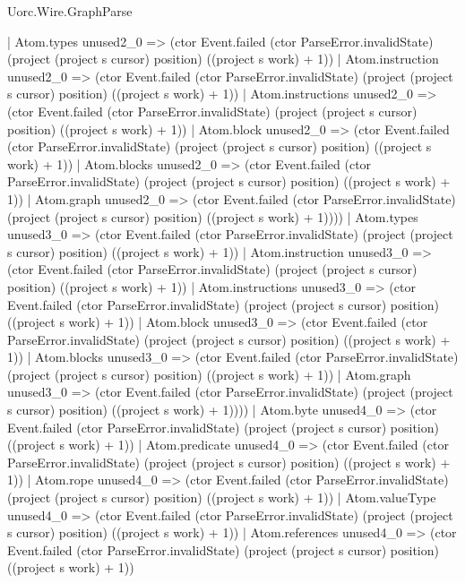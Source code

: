 \begin{lexlean}{Uorc.Wire.GraphParse}
\begin{semanticmodule}
{                      | Atom.types unused2_0 => (ctor Event.failed (ctor ParseError.invalidState) (project (project s cursor) position) ((project s work) + 1))
                      | Atom.instruction unused2_0 => (ctor Event.failed (ctor ParseError.invalidState) (project (project s cursor) position) ((project s work) + 1))
                      | Atom.instructions unused2_0 => (ctor Event.failed (ctor ParseError.invalidState) (project (project s cursor) position) ((project s work) + 1))
                      | Atom.block unused2_0 => (ctor Event.failed (ctor ParseError.invalidState) (project (project s cursor) position) ((project s work) + 1))
                      | Atom.blocks unused2_0 => (ctor Event.failed (ctor ParseError.invalidState) (project (project s cursor) position) ((project s work) + 1))
                      | Atom.graph unused2_0 => (ctor Event.failed (ctor ParseError.invalidState) (project (project s cursor) position) ((project s work) + 1))))
                  | Atom.types unused3_0 => (ctor Event.failed (ctor ParseError.invalidState) (project (project s cursor) position) ((project s work) + 1))
                  | Atom.instruction unused3_0 => (ctor Event.failed (ctor ParseError.invalidState) (project (project s cursor) position) ((project s work) + 1))
                  | Atom.instructions unused3_0 => (ctor Event.failed (ctor ParseError.invalidState) (project (project s cursor) position) ((project s work) + 1))
                  | Atom.block unused3_0 => (ctor Event.failed (ctor ParseError.invalidState) (project (project s cursor) position) ((project s work) + 1))
                  | Atom.blocks unused3_0 => (ctor Event.failed (ctor ParseError.invalidState) (project (project s cursor) position) ((project s work) + 1))
                  | Atom.graph unused3_0 => (ctor Event.failed (ctor ParseError.invalidState) (project (project s cursor) position) ((project s work) + 1))))
              | Atom.byte unused4_0 => (ctor Event.failed (ctor ParseError.invalidState) (project (project s cursor) position) ((project s work) + 1))
              | Atom.predicate unused4_0 => (ctor Event.failed (ctor ParseError.invalidState) (project (project s cursor) position) ((project s work) + 1))
              | Atom.rope unused4_0 => (ctor Event.failed (ctor ParseError.invalidState) (project (project s cursor) position) ((project s work) + 1))
              | Atom.valueType unused4_0 => (ctor Event.failed (ctor ParseError.invalidState) (project (project s cursor) position) ((project s work) + 1))
              | Atom.references unused4_0 => (ctor Event.failed (ctor ParseError.invalidState) (project (project s cursor) position) ((project s work) + 1))
}
\end{semanticmodule}
\end{lexlean}
